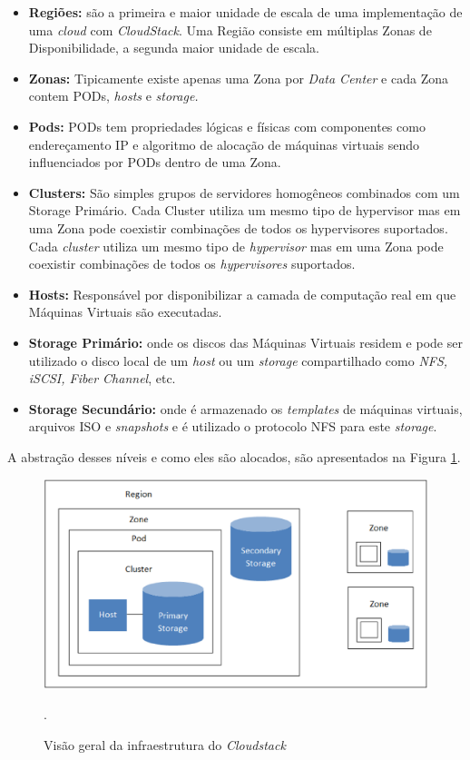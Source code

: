 \begin{itemize}
\item \textbf{Regiões:} são a primeira e maior unidade de escala de uma implementação de uma \textit{cloud} com \textit{CloudStack}. Uma Região consiste em múltiplas Zonas de Disponibilidade, a segunda maior unidade de escala.
\item \textbf{Zonas: } Tipicamente existe apenas uma Zona por \textit{Data Center} e cada Zona contem PODs, \textit{hosts} e \textit{storage.}
\item \textbf{Pods: } PODs tem propriedades lógicas e físicas com componentes como endereçamento IP e algoritmo de alocação de máquinas virtuais sendo influenciados por PODs dentro de uma Zona.
\item \textbf{Clusters: } São simples grupos de servidores homogêneos combinados com um Storage Primário. Cada Cluster utiliza um mesmo tipo de hypervisor mas em uma Zona pode coexistir combinações de todos os hypervisores suportados. Cada \textit{cluster} utiliza um mesmo tipo de \textit{hypervisor} mas em uma Zona pode coexistir combinações de todos os \textit{hypervisores} suportados.
\item \textbf{Hosts: } Responsável por disponibilizar a camada de computação real em que Máquinas Virtuais são executadas.
\item \textbf{Storage Primário: }  onde os discos das Máquinas Virtuais residem e pode ser utilizado o disco local de um \textit{host} ou um \textit{storage} compartilhado como \textit{NFS, iSCSI, Fiber Channel}, etc.
\item \textbf{Storage Secundário:} onde é armazenado os \textit{templates} de máquinas virtuais, arquivos ISO e \textit{snapshots} e é utilizado o protocolo NFS para este \textit{storage}.
\end{itemize}

A abstração desses níveis e como eles são alocados, são apresentados na Figura \ref{diagramacloudstack}.

\begin{figure}[!htb]
\centering
\includegraphics [keepaspectratio=true,scale=0.50]{figuras/cloudstack_structure.eps}
\caption{Visão geral da infraestrutura do \textit{Cloudstack}}
\cite{cloudstack}.
\label{diagramacloudstack}
\end{figure}

